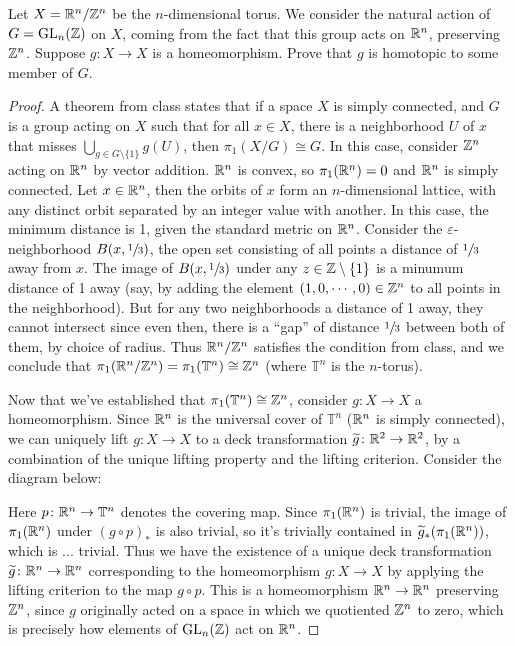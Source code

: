 \begin{prob}
    Let $X=\mathbb{R}^n/\mathbb{Z}^n$ be the $n$-dimensional torus.  We consider the natural action of $G=\operatorname{GL}_n(\mathbb{Z})$ on $X$, coming from the fact that this group acts on $\mathbb{R}^n$, preserving $\mathbb{Z}^n$.  Suppose $g:X\to X$ is a homeomorphism.  Prove that $g$ is homotopic to some member of $G$.
\end{prob}
\begin{proof}
    A theorem from class states that if a space $X$ is simply connected, and $G$ is a group acting on $X$ such that for all $x\in X$, there is a neighborhood $U$ of $x$ that misses $\bigcup_{g\in G \setminus \{1\} } g(U)$, then $\pi_1(X /G) \cong G$. In this case, consider $\mathbb{Z}^n $ acting on $\mathbb{R}^n $ by vector addition. $\mathbb{R}^n $ is convex, so $\pi_1(\mathbb{R}^n )=0$ and $\mathbb{R}^n $ is simply connected. Let $x\in \mathbb{R}^n $, then the orbits of $x$ form an $n$-dimensional lattice, with any distinct orbit separated by an integer value with another. In this case, the minimum distance is 1, given the standard metric on $\mathbb{R}^n $. Consider the $\varepsilon $-neighborhood $B(x,\sfrac{1}{3})$, the open set consisting of all points a distance of $\sfrac{1}{3}$ away from $x$. The image of $B(x,\sfrac{1}{3})$ under any $z\in \mathbb{Z}\setminus \{1\} $ is a minumum distance of 1 away (say, by adding the element $(1,0,\cdots ,0)\in \mathbb{Z}^n $ to all points in the neighborhood). But for any two neighborhoods a distance of 1 away, they cannot intersect since even then, there is a ``gap'' of distance $\sfrac{1}{3}$ between both of them, by choice of radius. Thus $\mathbb{R}^n /\mathbb{Z}^n $ satisfies the condition from class, and we conclude that $\pi_1(\mathbb{R}^n  /\mathbb{Z}^n ) = \pi_1(\mathbb{T}^n )\cong \mathbb{Z}^n  $ (where $\mathbb{T}^n $ is the $n$-torus).

    Now that we've established that $\pi_1(\mathbb{T}^n )\cong \mathbb{Z}^n $, consider $g \colon X \to X$ a homeomorphism. Since $\mathbb{R}^n $ is the universal cover of $\mathbb{T}^n $ ($\mathbb{R}^n $ is simply connected), we can uniquely lift $g \colon X \to X$ to a deck transformation $\widetilde g \colon \mathbb{R}^2\to \mathbb{R}^2$, by a combination of the unique lifting property and the lifting criterion. Consider the diagram below:
    \begin{figure}[H]
    \centering
    \end{figure}
    Here $p \colon \mathbb{R}^n  \to \mathbb{T}^n $ denotes the covering map. Since $\pi_1(\mathbb{R}^n )$ is trivial, the image of $\pi_1(\mathbb{R}^n )$ under $(g\circ p)_*$ is also trivial, so it's trivially contained in $\widetilde g_* (\pi_1(\mathbb{R}^n ))$, which is ... trivial. Thus we have the existence of a unique deck transformation $\widetilde g \colon \mathbb{R}^n \to \mathbb{R}^n $ corresponding to the homeomorphism $g \colon X \to X$ by applying the lifting criterion to the map $g\circ p$. This is a homeomorphism $\mathbb{R}^n \to \mathbb{R}^n $ preserving $\mathbb{Z}^n $, since $g$ originally acted on a space in which we quotiented $\mathbb{Z}^n $ to zero, which is precisely how elements of $\operatorname{GL}_n (\mathbb{Z})$ act on $\mathbb{R}^n $.


\end{proof}
